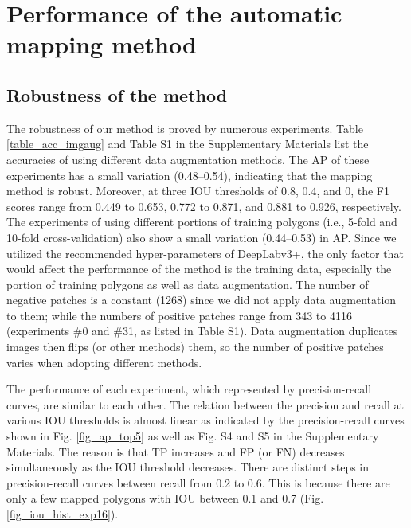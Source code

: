 \documentclass[preprint,12pt,authoryear]{elsarticle}
\begin{document}
\section{Performance of the automatic mapping method}
\label{sec_performance}

\subsection{Robustness of the method}
\label{subsec_robustness}

The robustness of our method is proved by numerous experiments. Table \ref{table_acc_imgaug} and Table S1 in the Supplementary Materials list the accuracies of using different data augmentation methods. The AP of these experiments has a small variation (0.48--0.54), indicating that the mapping method is robust. Moreover, at three IOU thresholds of 0.8, 0.4, and 0, the F1 scores range from 0.449 to 0.653, 0.772 to 0.871, and 0.881 to 0.926, respectively. The experiments of using different portions of training polygons (i.e., 5-fold and 10-fold cross-validation) also show a small variation (0.44--0.53) in AP. Since we utilized the recommended hyper-parameters of DeepLabv3+, the only factor that would affect the performance of the method is the training data, especially the portion of training polygons as well as data augmentation. The number of negative patches is a constant (1268) since we did not apply data augmentation to them; while the numbers of positive patches range from 343 to 4116 (experiments \#0 and \#31, as listed in Table S1). Data augmentation duplicates images then flips (or other methods) them, so the number of positive patches varies when adopting different methods.

The performance of each experiment, which represented by precision-recall curves, are similar to each other. The relation between the precision and recall at various IOU thresholds is almost linear as indicated by the precision-recall curves shown in Fig. \ref{fig_ap_top5} as well as Fig. S4 and S5 in the Supplementary Materials. The reason is that TP increases and FP (or FN) decreases simultaneously as the IOU threshold decreases. There are distinct steps in precision-recall curves between recall from 0.2 to 0.6. This is because there are only a few mapped polygons with IOU between 0.1 and 0.7 (Fig. \ref{fig_iou_hist_exp16}).
\end{document}
